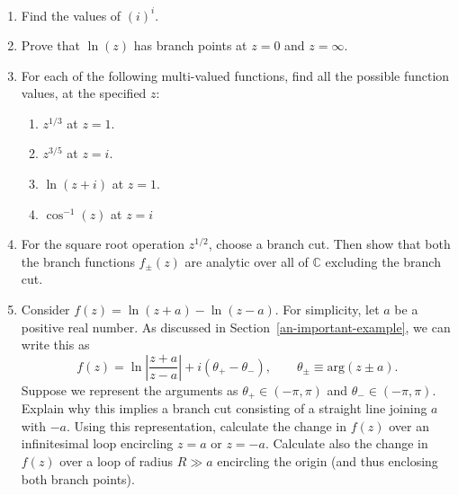 \documentclass[10pt,a4paper]{article}
\begin{document}
\begin{enumerate}
\item
Find the values of $(i)^i$.

\item
Prove that $\ln(z)$ has branch points at $z = 0$ and $z = \infty$.

\item For each of the following multi-valued functions, find all the possible
function values, at the specified $z$:
\begin{enumerate}
\item $z^{1/3}$ at $z = 1$.

\item $z^{3/5}$ at $z = i$.

\item $\ln(z+i)$ at $z = 1$.

\item $\cos^{-1}(z)$ at $z = i$
\end{enumerate}

\item
For the square root operation $z^{1/2}$, choose a branch cut. Then
show that both the branch functions $f_\pm(z)$ are analytic over all
of $\mathbb{C}$ excluding the branch cut.

\item
  Consider $f(z) = \ln(z+a) - \ln(z-a)$. For simplicity, let $a$ be a
  positive real number. As discussed in
  Section~\ref{an-important-example}, we can write this as
\begin{equation}
f(z) = \ln\left|\frac{z+a}{z-a}\right| + i(\theta_+ - \theta_-), \qquad \theta_\pm \equiv \mathrm{arg}(z\pm a).
\end{equation}
Suppose we represent the arguments as $\theta_+ \in (-\pi,\pi)$ and
$\theta_- \in (-\pi,\pi)$. Explain why this implies a branch cut
consisting of a straight line joining $a$ with $-a$. Using this
representation, calculate the change in $f(z)$ over an infinitesimal
loop encircling $z = a$ or $z = -a$. Calculate also the change in
$f(z)$ over a loop of radius $R \gg a$ encircling the origin (and
thus enclosing both branch points).
\end{enumerate}
\end{document}
